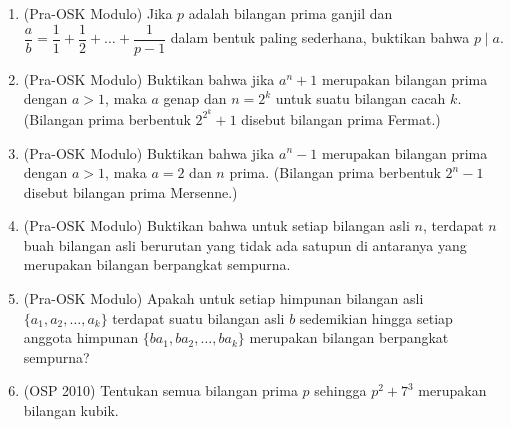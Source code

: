 \documentclass[12pt]{scrartcl}
\begin{document}
\begin{enumerate}[resume]
	\item (Pra-OSK Modulo)
	Jika $p$ adalah bilangan prima ganjil dan
	$\dfrac{a}{b} = \dfrac{1}{1} + \dfrac{1}{2} + \dots + \dfrac{1}{p - 1}$
	dalam bentuk paling sederhana,
	buktikan bahwa $p \mid a$.

	\item (Pra-OSK Modulo)
	Buktikan bahwa jika $a^n + 1$ merupakan bilangan prima dengan $a > 1$,
	maka $a$ genap dan $n = 2^k$ untuk suatu bilangan cacah $k$.
	(Bilangan prima berbentuk $2^{2^k} + 1$ disebut bilangan prima Fermat.)

	\item (Pra-OSK Modulo)
	Buktikan bahwa jika $a^n - 1$ merupakan bilangan prima dengan $a > 1$,
	maka $a = 2$ dan $n$ prima.
	(Bilangan prima berbentuk $2^n - 1$ disebut bilangan prima Mersenne.)

	\item (Pra-OSK Modulo)
	Buktikan bahwa untuk setiap bilangan asli $n$,
	terdapat $n$ buah bilangan asli berurutan yang tidak ada satupun
	di antaranya yang merupakan bilangan berpangkat sempurna.

	\item (Pra-OSK Modulo)
	Apakah untuk setiap himpunan bilangan asli $\{a_1, a_2, \ldots, a_k\}$
	terdapat suatu bilangan asli $b$ sedemikian hingga setiap anggota himpunan
	$\{ba_1, ba_2, \ldots, ba_k\}$ merupakan bilangan berpangkat sempurna?

	\item (OSP 2010)
	Tentukan semua bilangan prima $p$ sehingga $p^2 + 7^3$ merupakan bilangan kubik.

\end{enumerate}
\end{document}
